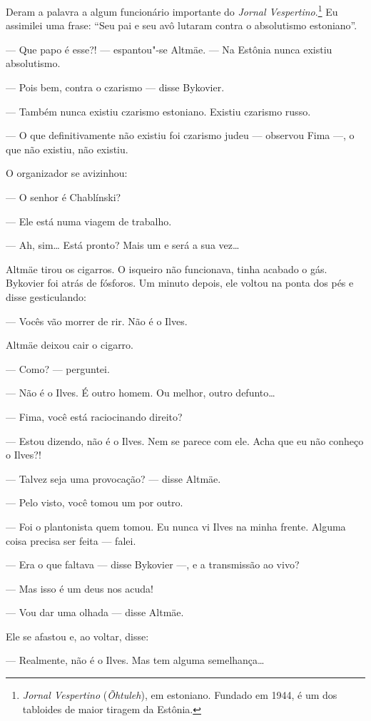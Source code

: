 Deram a palavra a algum funcionário importante do \emph{Jornal
Vespertino}.\footnote{\emph{Jornal Vespertino} (\emph{Õhtuleh}),
  em estoniano. Fundado em 1944, é um dos tabloides de maior tiragem da
  Estônia.} Eu assimilei uma frase: ``Seu pai e seu avô lutaram contra o
absolutismo estoniano''.

--- Que papo é esse?! --- espantou"-se Altmäe. --- Na Estônia nunca
existiu absolutismo.

--- Pois bem, contra o czarismo --- disse Bykovier.

--- Também nunca existiu czarismo estoniano. Existiu czarismo russo.

--- O que definitivamente não existiu foi czarismo judeu --- observou
Fima ---, o que não existiu, não existiu.

O organizador se avizinhou:

--- O senhor é Chablínski?

--- Ele está numa viagem de trabalho.

--- Ah, sim\ldots{} Está pronto? Mais um e será a sua vez\ldots{}

Altmäe tirou os cigarros. O isqueiro não funcionava, tinha acabado o
gás. Bykovier foi atrás de fósforos. Um minuto depois, ele voltou na
ponta dos pés e disse gesticulando:

--- Vocês vão morrer de rir. Não é o Ilves.

Altmäe deixou cair o cigarro.

--- Como? --- perguntei.

--- Não é o Ilves. É outro homem. Ou melhor, outro defunto\ldots{}

--- Fima, você está raciocinando direito?

--- Estou dizendo, não é o Ilves. Nem se parece com ele. Acha que eu não
conheço o Ilves?!

--- Talvez seja uma provocação? --- disse Altmäe.

--- Pelo visto, você tomou um por outro.

--- Foi o plantonista quem tomou. Eu nunca vi Ilves na minha frente.
Alguma coisa precisa ser feita --- falei.

--- Era o que faltava --- disse Bykovier ---, e a transmissão ao vivo?

--- Mas isso é um deus nos acuda!

--- Vou dar uma olhada --- disse Altmäe.

Ele se afastou e, ao voltar, disse:

--- Realmente, não é o Ilves. Mas tem alguma semelhança\ldots{}


